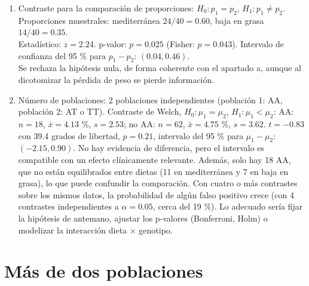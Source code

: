 \documentclass[
  spanish,
  a4paper,
]{scrreport}
\theoremstyle{definition}
\theoremstyle{remark}
\begin{document}
\begin{tcolorbox}
\begin{enumerate}
  Que un cambio sea significativo y el otro no, no demuestra que las
  dietas difieran. Para eso hay que comparar los cambios entre grupos
  con un contraste de muestras independientes: diferencia \(=-2.70\)
  mg/dL, \(t=-1.52\) con 78 grados de libertad, \(p=0.13\), intervalo
  \((-6.25, 0.85)\). No hay evidencia suficiente de que la dieta
  mediterránea reduzca la glucosa más que la baja en grasa, y una bajada
  de 3 mg/dL tiene poca relevancia clínica.
\item
  Contraste para la comparación de proporciones: \(H_0:p_1=p_2\),
  \(H_1:p_1\neq p_2\).\\
  Proporciones muestrales: mediterránea \(24/40=0.60\), baja en grasa
  \(14/40=0.35\).\\
  Estadístico: \(z=2.24\). p-valor: \(p=0.025\) (Fisher: \(p=0.043\)).
  Intervalo de confianza del 95 \% para \(p_1-p_2\): \((0.04, 0.46)\).\\
  Se rechaza la hipótesis nula, de forma coherente con el apartado a,
  aunque al dicotomizar la pérdida de peso se pierde información.
\item
  Número de poblaciones: 2 poblaciones independientes (población 1: AA,
  población 2: AT o TT). Contraste de Welch, \(H_0:\mu_1=\mu_2\),
  \(H_1:\mu_1<\mu_2\): AA: \(n=18\), \(\bar x=4.13\) \%, \(s=2.53\); no
  AA: \(n=62\), \(\bar x=4.75\) \%, \(s=3.62\). \(t=-0.83\) con 39.4
  grados de libertad, \(p=0.21\), intervalo del 95 \% para
  \(\mu_1-\mu_2\): \((-2.15, 0.90)\). No hay evidencia de diferencia,
  pero el intervalo es compatible con un efecto clínicamente relevante.
  Además, solo hay 18 AA, que no están equilibrados entre dietas (11 en
  mediterránea y 7 en baja en grasa), lo que puede confundir la
  comparación. Con cuatro o más contrastes sobre los mismos datos, la
  probabilidad de algún falso positivo crece (con 4 contrastes
  independientes a \(\alpha=0.05\), cerca del 19 \%). Lo adecuado sería
  fijar la hipótesis de antemano, ajustar los p-valores (Bonferroni,
  Holm) o modelizar la interacción dieta × genotipo.
\end{enumerate}

\end{tcolorbox}

\section{Más de dos poblaciones}\label{muxe1s-de-dos-poblaciones}
\end{document}
